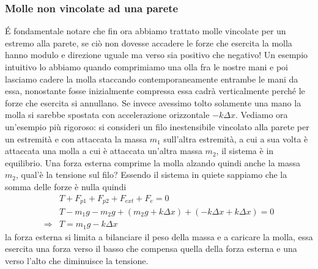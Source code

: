\documentclass[10pt,a4paper]{article}
\begin{document}
\subsubsection*{Molle non vincolate ad una parete}
\'{E} fondamentale notare che fin ora abbiamo trattato molle vincolate per un estremo alla parete, se ciò non dovesse accadere le forze che esercita la molla hanno modulo e direzione uguale ma verso sia positivo che negativo! Un esempio intuitivo lo abbiamo quando comprimiamo una olla fra le nostre mani e poi lasciamo cadere la molla staccando contemporaneamente entrambe le mani da essa, nonostante fosse inizialmente compressa essa cadrà verticalmente perché le forze che esercita si annullano. Se invece avessimo tolto solamente una mano la molla si sarebbe spostata con accelerazione orizzontale $-k \Delta x$. Vediamo ora un'esempio più rigoroso: si consideri un filo inestensibile vincolato alla parete per un estremità e con attaccata la massa $m_1$ sull'altra estremità, a cui a sua volta è attaccata una molla a cui è attaccata un'altra massa $m_2$, il sistema è in equilibrio. Una forza esterna comprime la molla alzando quindi anche la massa $m_2$, qual'è la tensione sul filo? Essendo il sistema in quiete sappiamo che la somma delle forze è nulla quindi
\begin{align*}
	&T + F_{p1}+F_{p2}+F_{ext}+F_e = 0\\
	&T -m_1g-m_2g+(m_2g + k\Delta x) + (-k\Delta x + k\Delta x)= 0\\
	\Rightarrow & T = m_1 g - k \Delta x 
\end{align*}
la forza esterna si limita a bilanciare il peso della massa e a caricare la molla, essa esercita una forza verso il basso che compensa quella della forza esterna e una verso l'alto che diminuisce la tensione. 
\end{document}
